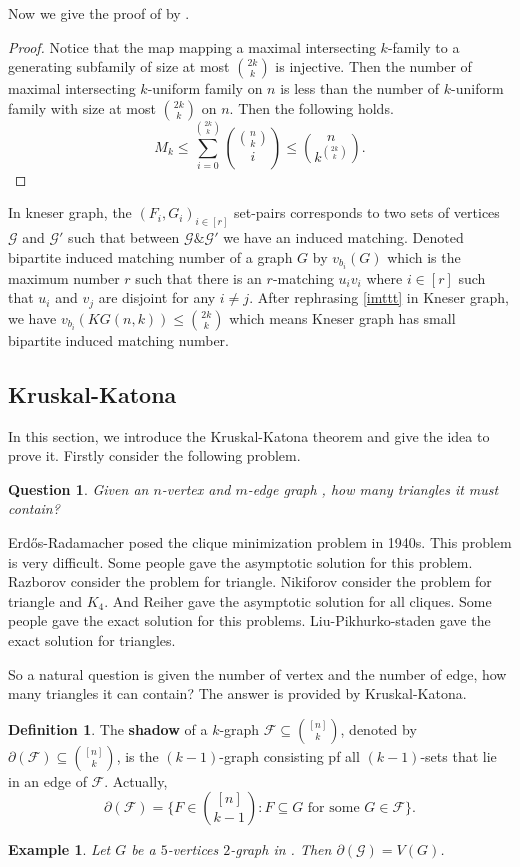\documentclass{article}
\newtheorem{example}[theorem]{Example}
\newtheorem{question}[theorem]{Question}
\theoremstyle{definition}
\newtheorem{definition}[theorem]{Definition}
\def\Erdos{Erd\H{o}s}
\begin{document}
Now we give the proof of  by .
\begin{proof}
    Notice that the map mapping a maximal intersecting $k$-family to a generating subfamily of size at most $\binom{2k}{k}$ is injective. Then  the number of maximal intersecting $k$-uniform family on $n$ is less than  the number of $k$-uniform family with size at most $\binom{2k}{k}$ on $n$. Then the following holds.
    $$M_k\le \underset{i=0}{\overset{\binom{2k}{k}}{\sum}}{\binom{\binom{n}{k}}{i}}\le \binom{n}{k^{\binom{2k}{k}}}.$$
\end{proof}
In kneser graph, the $(F_i,G_i)_{i\in[r]}$ set-pairs corresponds to two sets of vertices $\mathcal{G}$ and $\mathcal{G}'$ such that between $\mathcal{G} \& \mathcal{G}'$ we have an induced matching. Denoted bipartite induced matching number of a graph $G$ by $v_{b_i}(G)$ which is the maximum number $r$ such that there is an $r$-matching $u_iv_i$ where $i\in [r]$ such that $u_i$ and $v_j$ are disjoint for any $i\neq j$. After rephrasing \cref{imttt} in Kneser graph, we have $v_{b_i}(KG(n,k))\leq \binom{2k}{k}$ which means Kneser graph has small bipartite induced matching number.



\subsection{Kruskal-Katona}
In this section, we introduce the Kruskal-Katona theorem and give the idea to prove it.
Firstly consider the following problem.
\begin{question}
    Given an $n$-vertex and $m$-edge graph , how many triangles it must contain? 
\end{question}

\Erdos{}-Radamacher posed the clique minimization problem in 1940s. This problem is very difficult. Some people gave the asymptotic solution for this problem. Razborov consider the problem for triangle. Nikiforov consider the problem for triangle and $K_4$. And Reiher gave the asymptotic solution for all cliques. Some people gave the exact solution for this problems. Liu-Pikhurko-staden gave the exact solution for triangles.

So a natural question is given the number of vertex and the number of edge, how many triangles it can contain? The answer is provided by Kruskal-Katona.

\begin{definition}
    The \textbf{shadow} of a $k$-graph $\mathcal{F}\subseteq \binom{[n]}{k}$, denoted by $\partial(\mathcal{F}) \subseteq \binom{[n]}{k}$, is the $(k-1)$-graph consisting pf all $(k-1)$-sets that lie in an edge of $\mathcal{F}$. Actually, 
    $$\partial (\mathcal{F})=\{F\in \binom{[n]}{k-1}:F\subseteq G \text{~for some~} G\in \mathcal{F}\}.$$
\end{definition}
\begin{example}
    Let $G$ be a $5$-vertices $2$-graph in . Then $\partial (\mathcal{G})=V(G)$.
\end{example}
\end{document}
